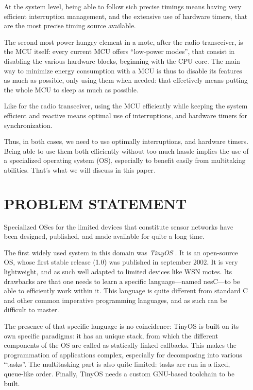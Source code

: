 \documentclass[a4paper,twoside]{article}
\begin{document}
At the system level, being able to follow sich precise timings means having
very efficient interruption management, and the extensive use of hardware
timers, that are the most precise timing source available.

The second most power hungry element in a mote, after the radio transceiver,
is the MCU itself: every current MCU offers ``low-power modes'', that consist
in disabling the various hardware blocks, beginning with the CPU core.
The main way to minimize energy consumption with a MCU is thus to disable
its features as much as possible, only using them when needed:
that effectively means putting the whole MCU to sleep as much as possible.

Like for the radio transceiver, using the MCU efficiently while keeping
the system efficient and reactive means optimal use of interruptions,
and hardware timers for synchronization.

Thus, in both cases, we need to use optimally interruptions, and hardware
timers. Being able to use them both efficiently without too much hassle
implies the use of a specialized operating system (OS), especially to
benefit easily from multitaking abilities. That's what we will discuss
in this paper.


\section{\uppercase{Problem statement}}

Specialized OSes for the limited devices that constitute sensor networks have
been designed, published, and made available for quite a long time.


The first widely used system in this domain was \emph{TinyOS} \cite{TinyOS}.
It is an open-source OS, whose first stable release (1.0) was published in
september 2002. It is very lightweight, and as such well adapted to limited
devices like WSN motes. Its drawbacks are that one needs to learn a specific
language---named nesC---to be able to efficiently work within it. This
language is quite different from standard C and other common imperative
programming languages, and as such can be difficult to master.

The presence of that specific language is no coincidence: TinyOS is built
on its own specific paradigms: it has an unique stack, from which the
different components of the OS are called as statically linked callbacks.
This makes the programmation of applications complex, especially for
decomposing into various ``tasks''. The multitasking part is also
quite limited: tasks are run in a fixed, queue-like order. Finally,
TinyOS needs a custom GNU-based toolchain to be built.
\end{document}
